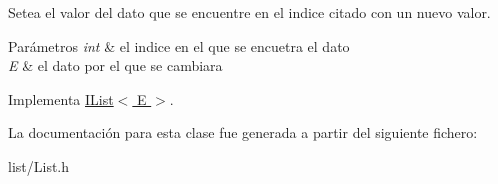 Setea el valor del dato que se encuentre en el indice citado con un nuevo valor. 


\begin{DoxyParams}{Parámetros}
{\em int} & el indice en el que se encuetra el dato \\
\hline
{\em E} & el dato por el que se cambiara \\
\hline
\end{DoxyParams}


Implementa \hyperlink{classIList_a119ed658d2804aec0b9fef9325c03073}{I\-List$<$ E $>$}.



La documentación para esta clase fue generada a partir del siguiente fichero\-:\begin{DoxyCompactItemize}
\item 
list/List.\-h\end{DoxyCompactItemize}
